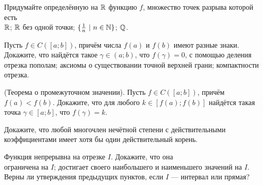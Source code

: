 \documentclass[a4paper,12pt]{article}
\begin{document}
 Придумайте определённую на $\mathbb{R}$ функцию $f$, множество точек разрыва которой есть\\
 $\mathbb{R}$;
 $\mathbb{R}$ без одной точки;
 $\{\frac1n\ | \ n\in\mathbb{N}\}$;
 $\mathbb{Q}$.





Пусть $f\in C([a;b])$, причём
числа $f(a)$ и $f(b)$ имеют разные знаки. Докажите, что
найдётся такое $\gamma\in (a;b)$, что
$f(\gamma)=0$, с помощью
деления отрезка пополам;
аксиомы о существовании точной верхней грани;
компактности отрезка.

{\small\sc (Теорема о промежуточном значении).}
Пусть $f\in C([a;b])$, причём  $f(a) < f(b)$.
Докажите, что для любого $k \in [f(a); f(b)]$  найдётся такая
точка $\gamma\in [a;b]$, что $f(\gamma) = k$.



 Докажите, что любой многочлен нечётной степени с действительными коэффициентами имеет хотя бы один действительный
корень.











 Функция непрерывна на отрезке $I$. Докажите, что она\\
 ограничена на $I$;
 достигает своего наибольшего и наименьшего значений на $I$.\\
 Верны ли утверждения предыдущих пунктов, если $I$ --- интервал или прямая?
\end{document}
